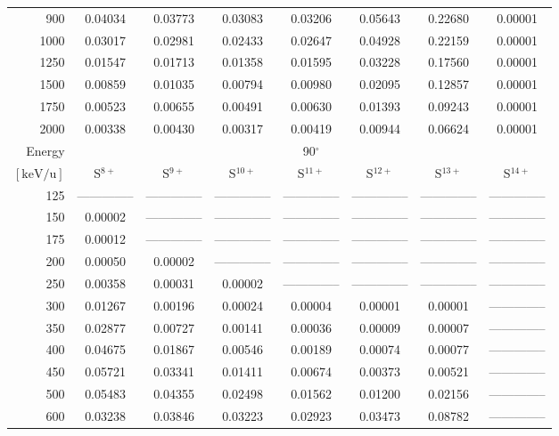\begin{table}[ht]
\begin{tabular}{r|c|c|c|c|c|c|c}
      900 & 0.04034 & 0.03773 & 0.03083 & 0.03206 & 0.05643 & 0.22680 & 0.00001 \\
     1000 & 0.03017 & 0.02981 & 0.02433 & 0.02647 & 0.04928 & 0.22159 & 0.00001 \\
     1250 & 0.01547 & 0.01713 & 0.01358 & 0.01595 & 0.03228 & 0.17560 & 0.00001 \\
     1500 & 0.00859 & 0.01035 & 0.00794 & 0.00980 & 0.02095 & 0.12857 & 0.00001 \\
     1750 & 0.00523 & 0.00655 & 0.00491 & 0.00630 & 0.01393 & 0.09243 & 0.00001 \\
     2000 & 0.00338 & 0.00430 & 0.00317 & 0.00419 & 0.00944 & 0.06624 & 0.00001 \\ \cline{1-8}
    Energy & \multicolumn{7}{c}{90$^\circ$} \\ \cline{2-8}
    $\mathrm{[keV/u]}$ & S$^{8+}$ & S$^{9+}$ & S$^{10+}$ & S$^{11+}$ & S$^{12+}$ & S$^{13+}$ & S$^{14+}$ \\ \cline{1-8}
      125 & -------------- & -------------- & -------------- & -------------- & -------------- & -------------- & -------------- \\
      150 & 0.00002 & -------------- & -------------- & -------------- & -------------- & -------------- & -------------- \\
      175 & 0.00012 & -------------- & -------------- & -------------- & -------------- & -------------- & -------------- \\
      200 & 0.00050 & 0.00002 & -------------- & -------------- & -------------- & -------------- & -------------- \\
      250 & 0.00358 & 0.00031 & 0.00002 & -------------- & -------------- & -------------- & -------------- \\
      300 & 0.01267 & 0.00196 & 0.00024 & 0.00004 & 0.00001 & 0.00001 & -------------- \\
      350 & 0.02877 & 0.00727 & 0.00141 & 0.00036 & 0.00009 & 0.00007 & -------------- \\
      400 & 0.04675 & 0.01867 & 0.00546 & 0.00189 & 0.00074 & 0.00077 & -------------- \\
      450 & 0.05721 & 0.03341 & 0.01411 & 0.00674 & 0.00373 & 0.00521 & -------------- \\
      500 & 0.05483 & 0.04355 & 0.02498 & 0.01562 & 0.01200 & 0.02156 & -------------- \\
      600 & 0.03238 & 0.03846 & 0.03223 & 0.02923 & 0.03473 & 0.08782 & -------------- \\

\end{tabular}
\end{table}
